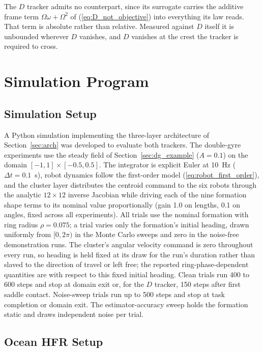 \documentclass[lettersize,journal]{IEEEtran}
\begin{document}
The $D$ tracker admits no counterpart, since its surrogate carries the
additive frame term $\Omega\omega + \Omega^2$ of
(\ref{eq:D_not_objective}) into everything its law reads. That term is
absolute rather than relative. Measured against $D$ itself it is
unbounded wherever $D$ vanishes, and $D$ vanishes at the crest the
tracker is required to cross.

\section{Simulation Program}
\label{sec:methods}

\subsection{Simulation Setup}
\label{sec:sim_setup}

A Python simulation implementing the three-layer architecture of
Section~\ref{sec:arch} was developed to evaluate both trackers.
The double-gyre experiments use the steady field of
Section~\ref{sec:dg_example} ($A = 0.1$) on the domain $[-1, 1] \times
[-0.5, 0.5]$. The integrator is explicit Euler at 10~Hz ($\Delta t =
0.1$~s), robot dynamics follow the first-order model
(\ref{eq:robot_first_order}), and the cluster layer distributes the centroid
command to the six robots through the analytic $12 \times 12$ inverse
Jacobian while driving each of the nine formation shape terms to its
nominal value proportionally (gain 1.0 on lengths, 0.1 on angles, fixed
across all experiments). All trials use the nominal formation with ring
radius $\rho = 0.075$; a trial varies only the formation's initial
heading, drawn uniformly from $[0, 2\pi)$ in the Monte Carlo sweeps and
zero in the noise-free demonstration runs. The cluster's angular
velocity command is zero throughout every run, so heading is held fixed
at its draw for the run's duration rather than slaved to the direction
of travel or left free; the reported ring-phase-dependent quantities
are with respect to this fixed initial
heading. Clean trials run 400 to 600
steps and stop at domain exit or, for the $D$ tracker, 150 steps after
first saddle contact. Noise-sweep trials run up to 500 steps and stop
at task completion or domain exit. The estimator-accuracy sweep holds
the formation static and draws independent noise per trial. 


\subsection{Ocean HFR Setup}
\label{sec:ocean_sim}
\end{document}

